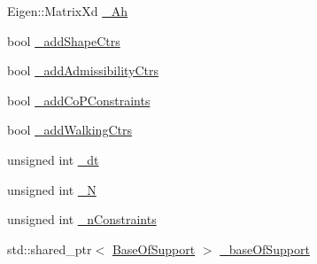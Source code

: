 \begin{DoxyCompactItemize}
\-Eigen\-::\-Matrix\-Xd \hyperlink{classMIQPLinearConstraints_aacba15c9dfc1c8f88e253a4f75e422fd}{\-\_\-\-Ah}
\item 
bool \hyperlink{classMIQPLinearConstraints_ae8df8b83e80484853b624f6693ed2725}{\-\_\-add\-Shape\-Ctrs}
\item 
bool \hyperlink{classMIQPLinearConstraints_a155ab4ad5ab14b793611c12473ce9297}{\-\_\-add\-Admissibility\-Ctrs}
\item 
bool \hyperlink{classMIQPLinearConstraints_a8e20d42828c638f41d074153cc0957d8}{\-\_\-add\-Co\-P\-Constraints}
\item 
bool \hyperlink{classMIQPLinearConstraints_ad1363c7fde3dd4f20adc92a7e1865579}{\-\_\-add\-Walking\-Ctrs}
\item 
unsigned int \hyperlink{classMIQPLinearConstraints_a403b0a1f684bda20236a759bd72950f2}{\-\_\-dt}
\item 
unsigned int \hyperlink{classMIQPLinearConstraints_a1edaf84d613dde3f86fd9e78aa14a077}{\-\_\-\-N}
\item 
unsigned int \hyperlink{classMIQPLinearConstraints_a2726424eb890fe556ce503096b418d0f}{\-\_\-n\-Constraints}
\item 
std\-::shared\-\_\-ptr$<$ \hyperlink{classBaseOfSupport}{\-Base\-Of\-Support} $>$ \hyperlink{classMIQPLinearConstraints_a9b26abbc012b0f39c6bef163d9c3faed}{\-\_\-base\-Of\-Support}
\end{DoxyCompactItemize}


